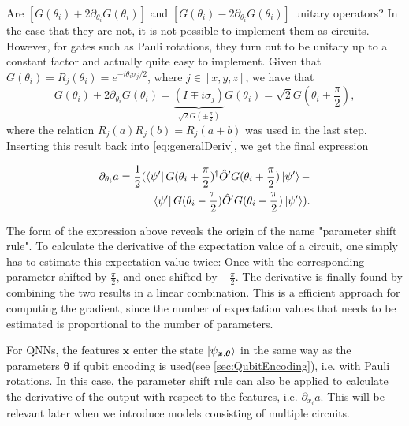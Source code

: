 Are $[G(\theta_i)+2\partial_{\theta_i}G(\theta_i)]$ and $[G(\theta_i)-2\partial_{\theta_i}G(\theta_i)]$ unitary operators? In the case that they are not, it is not possible to implement them as circuits. However, for gates such as Pauli rotations, they turn out to be unitary up to a constant factor and actually quite easy to implement. Given that $G(\theta_i) = R_j(\theta_i) = e^{-i\theta_i \sigma_j/2}$, where $j \in [x,y,z]$, we have that 
\begin{equation}
    G(\theta_i)\pm2\partial_{\theta_i}G(\theta_i) = 
    \underset{\sqrt{2}G(\pm \frac{\pi}{2})}{\underbrace{(I \mp i\sigma_j)}}G(\theta_i) = 
    \sqrt{2}G(\theta_i \pm \frac{\pi}{2}),
\end{equation}
where the relation $R_j(a)R_j(b) = R_j(a+b)$ was used in the last step. Inserting this result back into \cref{eq:generalDeriv}, we get the final expression 


\begin{equation}\label{eq:parameterShiftRule}
\begin{aligned}
    \partial_{\theta_i} a = 
    \frac{1}{2}(
    \bra{\psi'} G(\theta_i + \frac{\pi}{2})^{\dagger} \hat{O}' G(\theta_i + \frac{\pi}{2}) \ket{\psi'} -\\
    \bra{\psi'} G(\theta_i - \frac{\pi}{2}) \hat{O}' G(\theta_i - \frac{\pi}{2}) \ket{\psi'}).
\end{aligned}
\end{equation}

The form of the expression above reveals the origin of the name "parameter shift rule". To calculate the derivative of the expectation value of a circuit, one simply has to estimate this expectation value twice: Once with the corresponding parameter shifted by $\frac{\pi}{2}$, and once shifted by $-\frac{\pi}{2}$. The derivative is finally found by combining the two results in a linear combination. This is a efficient approach for computing the gradient, since the number of expectation values that needs to be estimated is proportional to the number of parameters.

For QNNs, the features $\boldsymbol{x}$ enter the state $\ket{\psi_{\boldsymbol{x},\boldsymbol{\theta}}}$ in the same way as the parameters $\boldsymbol{\theta}$ if qubit encoding is used(see \cref{sec:QubitEncoding}), i.e. with Pauli rotations. In this case, the parameter shift rule can also be applied to calculate the derivative of the output with respect to the features, i.e. $\partial_{x_i}a$. This will be relevant later when we introduce models consisting of multiple circuits. 

